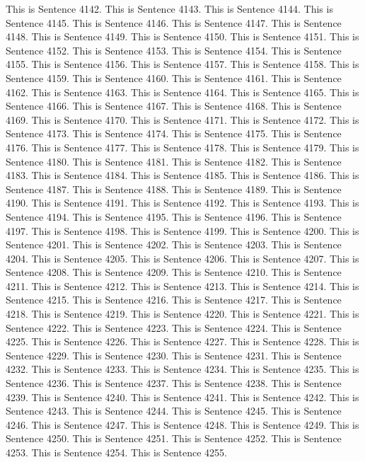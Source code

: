 \documentclass{article}
\begin{document}
This is Sentence 4142.
This is Sentence 4143.
This is Sentence 4144.
This is Sentence 4145.
This is Sentence 4146.
This is Sentence 4147.
This is Sentence 4148.
This is Sentence 4149.
This is Sentence 4150.
This is Sentence 4151.
This is Sentence 4152.
This is Sentence 4153.
This is Sentence 4154.
This is Sentence 4155.
This is Sentence 4156.
This is Sentence 4157.
This is Sentence 4158.
This is Sentence 4159.
This is Sentence 4160.
This is Sentence 4161.
This is Sentence 4162.
This is Sentence 4163.
This is Sentence 4164.
This is Sentence 4165.
This is Sentence 4166.
This is Sentence 4167.
This is Sentence 4168.
This is Sentence 4169.
This is Sentence 4170.
This is Sentence 4171.
This is Sentence 4172.
This is Sentence 4173.
This is Sentence 4174.
This is Sentence 4175.
This is Sentence 4176.
This is Sentence 4177.
This is Sentence 4178.
This is Sentence 4179.
This is Sentence 4180.
This is Sentence 4181.
This is Sentence 4182.
This is Sentence 4183.
This is Sentence 4184.
This is Sentence 4185.
This is Sentence 4186.
This is Sentence 4187.
This is Sentence 4188.
This is Sentence 4189.
This is Sentence 4190.
This is Sentence 4191.
This is Sentence 4192.
This is Sentence 4193.
This is Sentence 4194.
This is Sentence 4195.
This is Sentence 4196.
This is Sentence 4197.
This is Sentence 4198.
This is Sentence 4199.
This is Sentence 4200.
This is Sentence 4201.
This is Sentence 4202.
This is Sentence 4203.
This is Sentence 4204.
This is Sentence 4205.
This is Sentence 4206.
This is Sentence 4207.
This is Sentence 4208.
This is Sentence 4209.
This is Sentence 4210.
This is Sentence 4211.
This is Sentence 4212.
This is Sentence 4213.
This is Sentence 4214.
This is Sentence 4215.
This is Sentence 4216.
This is Sentence 4217.
This is Sentence 4218.
This is Sentence 4219.
This is Sentence 4220.
This is Sentence 4221.
This is Sentence 4222.
This is Sentence 4223.
This is Sentence 4224.
This is Sentence 4225.
This is Sentence 4226.
This is Sentence 4227.
This is Sentence 4228.
This is Sentence 4229.
This is Sentence 4230.
This is Sentence 4231.
This is Sentence 4232.
This is Sentence 4233.
This is Sentence 4234.
This is Sentence 4235.
This is Sentence 4236.
This is Sentence 4237.
This is Sentence 4238.
This is Sentence 4239.
This is Sentence 4240.
This is Sentence 4241.
This is Sentence 4242.
This is Sentence 4243.
This is Sentence 4244.
This is Sentence 4245.
This is Sentence 4246.
This is Sentence 4247.
This is Sentence 4248.
This is Sentence 4249.
This is Sentence 4250.
This is Sentence 4251.
This is Sentence 4252.
This is Sentence 4253.
This is Sentence 4254.
This is Sentence 4255.
\end{document}
